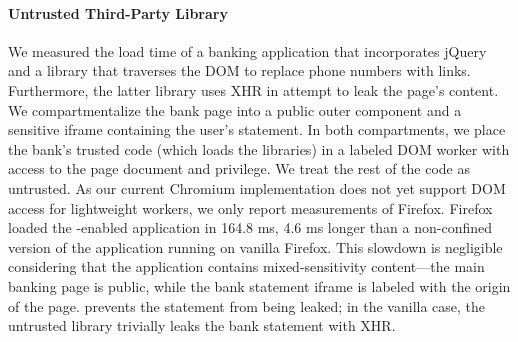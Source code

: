 \paragraph{Untrusted Third-Party Library}

We measured the load time of a banking application that incorporates
jQuery and a library that traverses the DOM to replace phone numbers
with links.
%
Furthermore, the latter library uses XHR in attempt to leak the page's
content.
%
We compartmentalize the bank page into a public outer component and a
sensitive iframe containing the user's statement. In both
compartments, we place the bank's trusted code (which loads the
libraries) in a labeled DOM worker with access to the page document
and privilege. We treat the rest of the code as untrusted.
%
As our current Chromium implementation does not yet support DOM access
for lightweight workers, we only report measurements of Firefox.
%
Firefox loaded the \sys{}-enabled application in 164.8 ms, 4.6 ms
longer than a non-confined version of the application running on
vanilla Firefox.
%
%
This slowdown is negligible considering that the application contains
mixed-sensitivity content---the main banking page is public, while the
bank statement iframe is labeled with the origin of the page. \sys{}
prevents the statement from being leaked; in the vanilla case, the
untrusted library trivially leaks the bank statement with XHR\@.





